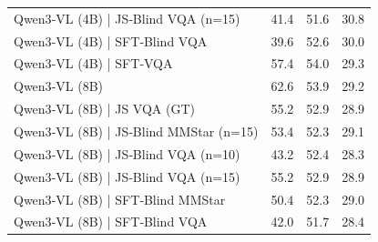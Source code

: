 \begin{tabular}{lrrr}
Qwen3‑VL (4B) | JS‑Blind VQA (n=15) & 41.4 & 51.6 & 30.8 \\
Qwen3‑VL (4B) | SFT‑Blind VQA & 39.6 & 52.6 & 30.0 \\
Qwen3‑VL (4B) | SFT‑VQA & 57.4 & 54.0 & 29.3 \\
Qwen3‑VL (8B) & 62.6 & 53.9 & 29.2 \\
Qwen3‑VL (8B) | JS VQA (GT) & 55.2 & 52.9 & 28.9 \\
Qwen3‑VL (8B) | JS‑Blind MMStar (n=15) & 53.4 & 52.3 & 29.1 \\
Qwen3‑VL (8B) | JS‑Blind VQA (n=10) & 43.2 & 52.4 & 28.3 \\
Qwen3‑VL (8B) | JS‑Blind VQA (n=15) & 55.2 & 52.9 & 28.9 \\
Qwen3‑VL (8B) | SFT‑Blind MMStar & 50.4 & 52.3 & 29.0 \\
Qwen3‑VL (8B) | SFT‑Blind VQA & 42.0 & 51.7 & 28.4 \\
\bottomrule
\end{tabular}
